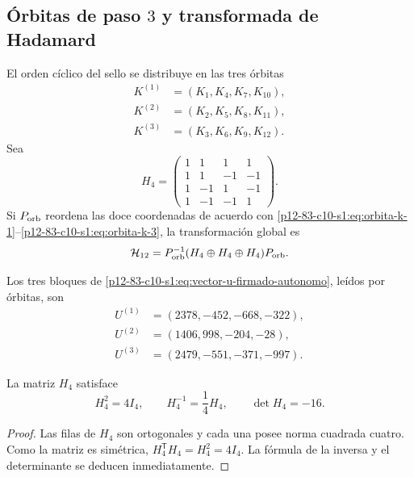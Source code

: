 \subsection{Órbitas de paso \(3\) y transformada de Hadamard}

El orden cíclico del sello se distribuye en las tres órbitas
\begin{align}
 K^{(1)}&=(K_1,K_4,K_7,K_{10}),
 \label{p12-83-c10-s1:eq:orbita-k-1}\\
 K^{(2)}&=(K_2,K_5,K_8,K_{11}),
 \label{p12-83-c10-s1:eq:orbita-k-2}\\
 K^{(3)}&=(K_3,K_6,K_9,K_{12}).
 \label{p12-83-c10-s1:eq:orbita-k-3}
\end{align}
Sea
\begin{equation}
 H_4=
 \begin{pmatrix}
 1&1&1&1\\
 1&1&-1&-1\\
 1&-1&1&-1\\
 1&-1&-1&1
 \end{pmatrix}.
 \label{p12-83-c10-s1:eq:matriz-hadamard-cuatro-autonoma}
\end{equation}
Si \(P_{\rm orb}\) reordena las doce coordenadas de acuerdo con
\eqref{p12-83-c10-s1:eq:orbita-k-1}--\eqref{p12-83-c10-s1:eq:orbita-k-3}, la transformación global es
\begin{equation}
 \mathcal H_{12}
 =P_{\rm orb}^{-1}
 (H_4\oplus H_4\oplus H_4)P_{\rm orb}.
 \label{p12-83-c10-s1:eq:hadamard-global-doce}
\end{equation}

Los tres bloques de \eqref{p12-83-c10-s1:eq:vector-u-firmado-autonomo}, leídos por
órbitas, son
\begin{align*}
 U^{(1)}&=(2378,-452,-668,-322),\\
 U^{(2)}&=(1406,998,-204,-28),\\
 U^{(3)}&=(2479,-551,-371,-997).
\end{align*}

\begin{lemma}
\label{p12-83-c10-s1:lem:cuarto-inversa-hadamard}
La matriz \(H_4\) satisface
\begin{equation}
 H_4^2=4I_4,
 \qquad
 H_4^{-1}=\frac14H_4,
 \qquad
 \det H_4=-16.
 \label{p12-83-c10-s1:eq:identidades-hadamard-cuatro}
\end{equation}
\end{lemma}

\begin{proof}
Las filas de \(H_4\) son ortogonales y cada una posee norma cuadrada cuatro.
Como la matriz es simétrica, \(H_4^{\mathsf T}H_4=H_4^2=4I_4\). La
fórmula de la inversa y el determinante se deducen inmediatamente.
\end{proof}

